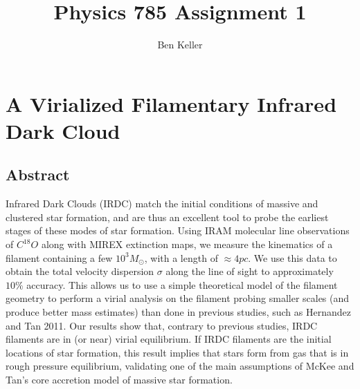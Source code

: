 \documentclass{article}
\author{Ben Keller}
\title{Physics 785 Assignment 1}
\begin{document}
\maketitle
\centering
\section*{A Virialized Filamentary Infrared Dark Cloud}
\subsection*{Abstract}
Infrared Dark Clouds (IRDC) match the initial conditions of massive 
and clustered star formation, and are thus an excellent tool
to probe the earliest stages of these modes of star formation.
Using IRAM molecular line observations of $C^{18}O$ along
with MIREX extinction maps, we measure the kinematics of a
filament containing a few $10^3 M_\odot$, with a length of
$\approx4pc$.  We use this data to obtain the total velocity
dispersion $\sigma$ along the line of sight to approximately
$10\%$ accuracy. This allows us to use a simple theoretical
model of the filament geometry to perform a virial analysis
on the filament probing smaller scales (and produce better
mass estimates) than done in 
previous studies, such as Hernandez and Tan 2011. Our results
show that, contrary to previous studies, IRDC filaments are
in (or near) virial equilibrium.  If IRDC filaments are the
initial locations of star formation, this result implies that
stars form from gas that is in rough pressure equilibrium, 
validating one of the main assumptions of McKee and Tan's
core accretion model of massive star formation.
\end{document}

